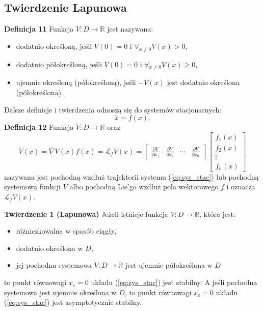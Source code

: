 \documentclass{article}
\begin{document}
\newpage
\subsection{Twierdzenie Lapunowa}
\textbf{Definicja 11}
Funkcja $V: D \rightarrow \mathbb{R}$ jest nazywana:
\begin{itemize}
    \item dodatnio określoną, jeśli $V(0) = 0$ i $\forall_{x\neq 0}V(x) > 0$,
    \item dodatnio półokreśloną, jeśli $V(0) = 0$ i $\forall_{x\neq 0}V(x) \geq 0$,
    \item ujemnie określoną (półokreśloną), jeśli $-V(x)$ jest dodatnio określona (półokreślona).
\end{itemize}

Dalsze definicje i twierdzenia odnoszą się do systemów stacjonarnych:
\begin{equation}\label{eq:sys_stac}
    \dot{x} = f(x).
\end{equation}
\textbf{Definicja 12}
Funkcja $\dot{V}: D \rightarrow \mathbb{R}$ oraz 
$$
    \dot{V}(x)=\nabla V(x)f(x) = \mathcal{L}_{f}V(x) = \begin{bmatrix} \frac{\partial V}{\partial x_{1}} & \frac{\partial V}{\partial x_{2}} & \cdots & \frac{\partial V}{\partial x_{n}} \end{bmatrix}
    \begin{bmatrix} f_{1}(x) \\ f_{2}(x) \\ \vdots \\ f_{n}(x) \end{bmatrix}
$$
nazywana jest pochodną wzdłuż trajektorii systemu (\ref{eq:sys_stac}) lub pochodną systemową funkcji $V$ albo pochodną Lie'go wzdłuż pola wektorowego $f$ i oznacza $\mathcal{L}_{f}V(x)$.

\textbf{Twierdzenie 1 (Lapunowa)}
Jeżeli istnieje funkcja $V: D \rightarrow \mathbb{R}$, która jest:
\begin{itemize}
    \item różniczkowalna w sposób ciągły,
    \item dodatnio określona w $D$,
    \item jej pochodna systemowa $\dot{V}:D\rightarrow \mathbb{R}$ jest ujemnie półokreślona w $D$
\end{itemize}
to punkt równowagi $x_{e} = 0$ układu (\ref{eq:sys_stac}) jest stabilny.
A jeśli pochodna systemowa jest ujemnie określona w $D$, to punkt równowagi $x_{e} = 0$ układu (\ref{eq:sys_stac}) jest asymptotycznie stabilny.
\end{document}
